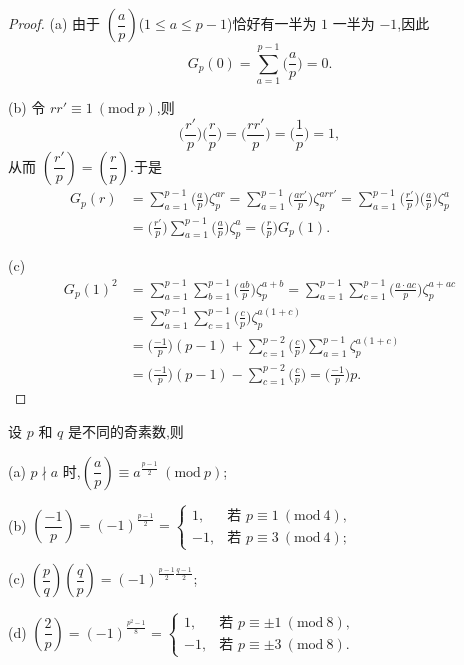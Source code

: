 \begin{proof}
(a) 由于 $\left(\dfrac{a}{p}\right)$($1\leqslant a\leqslant p-1$)恰好有一半为 $1$ 一半为 $-1$,因此
\[
  G_p(0)=\sum_{a=1}^{p-1}\Big(\frac{a}{p}\Big)=0.
\]

(b) 令 $rr'\equiv 1\ (\mathrm{mod}\ p)$,则
\[
  \Big(\frac{r'}{p}\Big)\Big(\frac{r}{p}\Big)=\Big(\frac{rr'}{p}\Big)=\Big(\frac{1}{p}\Big)=1,
\]
从而 $\left(\dfrac{r'}{p}\right)=\left(\dfrac{r}{p}\right)$.于是
\begin{align*}
  G_p(r)&=\sum_{a=1}^{p-1}\Big(\frac{a}{p}\Big)\zeta_p^{ar}
  =\sum_{a=1}^{p-1}\Big(\frac{ar'}{p}\Big)\zeta_p^{arr'}
  =\sum_{a=1}^{p-1}\Big(\frac{r'}{p}\Big)\Big(\frac{a}{p}\Big)\zeta_p^a\\
  &=\Big(\frac{r'}{p}\Big)\sum_{a=1}^{p-1}\Big(\frac{a}{p}\Big)\zeta_p^a
  =\Big(\frac{r}{p}\Big)G_p(1).
\end{align*}

(c)
\begin{align*}
  G_p(1)^2&=\sum_{a=1}^{p-1}\sum_{b=1}^{p-1}\Big(\frac{ab}{p}\Big)\zeta_p^{a+b}
  =\sum_{a=1}^{p-1}\sum_{c=1}^{p-1}\Big(\frac{a\cdot ac}{p}\Big)\zeta_p^{a+ac}\\
  &=\sum_{a=1}^{p-1}\sum_{c=1}^{p-1}\Big(\frac{c}{p}\Big)\zeta_p^{a(1+c)}\\
  &=\Big(\frac{-1}{p}\Big)(p-1)+\sum_{c=1}^{p-2}\Big(\frac{c}{p}\Big)\sum_{a=1}^{p-1}\zeta_p^{a(1+c)}\\
  &=\Big(\frac{-1}{p}\Big)(p-1)-\sum_{c=1}^{p-2}\Big(\frac{c}{p}\Big)
  =\Big(\frac{-1}{p}\Big)p.
\end{align*}
\end{proof}

\begin{theorem}\label{thm:2.16}
设 $p$ 和 $q$ 是不同的奇素数,则

(a) $p\nmid a$ 时,$\left(\dfrac{a}{p}\right)\equiv a^{\frac{p-1}{2}}\ (\mathrm{mod}\ p)$;

(b) $\left(\dfrac{-1}{p}\right)=(-1)^{\frac{p-1}{2}}=\begin{cases}1, & \text{若 } p\equiv 1\ (\mathrm{mod}\ 4),\\ -1, & \text{若 } p\equiv 3\ (\mathrm{mod}\ 4);\end{cases}$

(c) $\left(\dfrac{p}{q}\right)\left(\dfrac{q}{p}\right)=(-1)^{\frac{p-1}{2}\frac{q-1}{2}}$;

(d) $\left(\dfrac{2}{p}\right)=(-1)^{\frac{p^2-1}{8}}=\begin{cases}1, & \text{若 } p\equiv\pm 1\ (\mathrm{mod}\ 8),\\ -1, & \text{若 } p\equiv\pm 3\ (\mathrm{mod}\ 8).\end{cases}$
\end{theorem}

